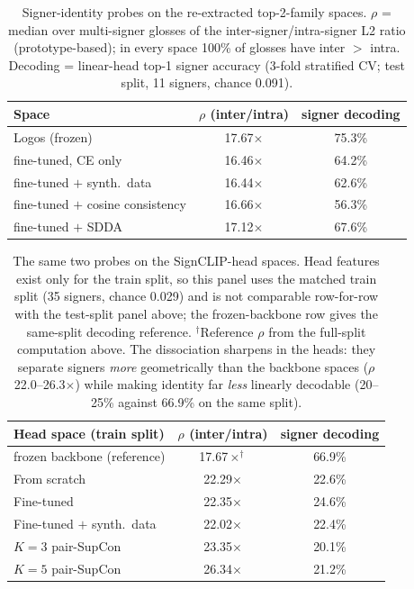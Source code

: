 \begin{table}[t]
\centering
\small
\begin{tabular}{lcc}
\toprule
\textbf{Space} & \textbf{$\rho$ (inter/intra)} & \textbf{signer decoding} \\
\midrule
Logos (frozen) & 17.67$\times$ & 75.3\% \\
fine-tuned, CE only       & 16.46$\times$ & 64.2\% \\
fine-tuned $+$ synth.\ data & 16.44$\times$ & 62.6\% \\
fine-tuned $+$ cosine consistency & 16.66$\times$ & 56.3\% \\
fine-tuned $+$ SDDA       & 17.12$\times$ & 67.6\% \\
\bottomrule
\end{tabular}
\caption{Signer-identity probes on the re-extracted top-2-family spaces.
$\rho$ = median over multi-signer glosses of the inter-signer/intra-signer
L2 ratio (prototype-based); in every space 100\% of glosses have
inter $>$ intra. Decoding = linear-head top-1 signer accuracy
(3-fold stratified CV; test split, 11 signers, chance 0.091).}
\label{tab:signer_probes}
\end{table}

\begin{table}[t]
\centering
\small
\begin{tabular}{lcc}
\toprule
\textbf{Head space (train split)} & \textbf{$\rho$ (inter/intra)} & \textbf{signer decoding} \\
\midrule
frozen backbone (reference)        & 17.67$\times^{\dagger}$ & 66.9\% \\
From scratch                       & 22.29$\times$ & 22.6\% \\
Fine-tuned                         & 22.35$\times$ & 24.6\% \\
Fine-tuned $+$ synth.\ data        & 22.02$\times$ & 22.4\% \\
$K{=}3$ pair-SupCon                & 23.35$\times$ & 20.1\% \\
$K{=}5$ pair-SupCon                & 26.34$\times$ & 21.2\% \\
\bottomrule
\end{tabular}
\caption{The same two probes on the SignCLIP-head spaces. Head features
exist only for the train split, so this panel uses the matched train
split (35 signers, chance 0.029) and is not comparable row-for-row with
the test-split panel above; the frozen-backbone row gives the same-split
decoding reference. $^{\dagger}$Reference $\rho$ from the full-split
computation above. The dissociation sharpens in the heads: they separate
signers \emph{more} geometrically than the backbone spaces
($\rho$ 22.0--26.3$\times$) while making identity far \emph{less}
linearly decodable (20--25\% against 66.9\% on the same
split).}
\label{tab:head_signer_probes}
\end{table}


